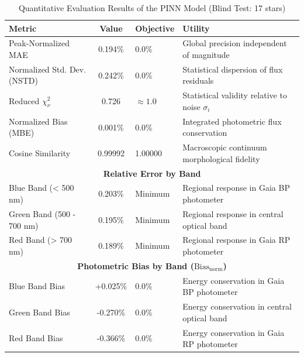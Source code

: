 
\begin{table}[htpb]
\centering
\caption{Quantitative Evaluation Results of the PINN Model (Blind Test: 17 stars)}
\label{tab:pinn_evaluation}
\begin{tabular}{lcll}
\hline
\textbf{Metric} & \textbf{Value} & \textbf{Objective} & \textbf{Utility} \\
\hline
Peak-Normalized MAE & 0.194\% & 0.0\% & Global precision independent of magnitude \\
Normalized Std. Dev. (NSTD) & 0.242\% & 0.0\% & Statistical dispersion of flux residuals \\
Reduced $\chi^2_\nu$ & 0.726 & $\approx 1.0$ & Statistical validity relative to noise $\sigma_i$ \\
Normalized Bias (MBE) & 0.001\% & 0.0\% & Integrated photometric flux conservation \\
Cosine Similarity & 0.99992 & 1.00000 & Macroscopic continuum morphological fidelity \\
\hline
\multicolumn{4}{c}{\textbf{Relative Error by Band}} \\
\hline
Blue Band (< 500 nm) & 0.203\% & Minimum & Regional response in Gaia BP photometer \\
Green Band (500 - 700 nm) & 0.195\% & Minimum & Regional response in central optical band \\
Red Band (> 700 nm) & 0.189\% & Minimum & Regional response in Gaia RP photometer \\
\hline
\multicolumn{4}{c}{\textbf{Photometric Bias by Band ($\text{Bias}_{\text{norm}}$)}} \\
\hline
Blue Band Bias & +0.025\% & 0.0\% & Energy conservation in Gaia BP photometer \\
Green Band Bias & -0.270\% & 0.0\% & Energy conservation in central optical band \\
Red Band Bias & -0.366\% & 0.0\% & Energy conservation in Gaia RP photometer \\
\hline
\end{tabular}
\end{table}
